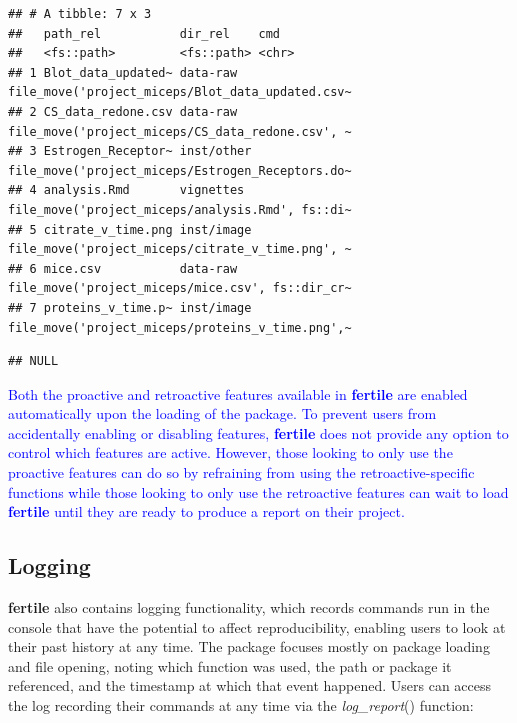 \documentclass[APA,LATO1COL]{WileyNJD-v2}\usepackage[]{graphicx}\usepackage[]{color}
\makeatletter
\newenvironment{kframe}{%
 \def\at@end@of@kframe{}%
 \ifinner\ifhmode%
  \def\at@end@of@kframe{\end{minipage}}%
  \begin{minipage}{\columnwidth}%
 \fi\fi%
 \def\FrameCommand##1{\hskip\@totalleftmargin \hskip-\fboxsep
 \colorbox{shadecolor}{##1}\hskip-\fboxsep
     \hskip-\linewidth \hskip-\@totalleftmargin \hskip\columnwidth}%
 \MakeFramed {\advance\hsize-\width
   \@totalleftmargin\z@ \linewidth\hsize
   \@setminipage}}%
 {\par\unskip\endMakeFramed%
 \at@end@of@kframe}
\newenvironment{knitrout}{}{} %
\newcommand{\pkg}[1]{\textbf{#1}}
\newcommand{\func}[1]{\textit{#1}()}
\makeatother
\begin{document}
\begin{knitrout}
\begin{kframe}
{\ttfamily\noindent\itshape\color{messagecolor}{\#\# --\ \  Suggestions for moving files ------------------------------- fertile 0.0.0.9027 --}}\begin{verbatim}
## # A tibble: 7 x 3
##   path_rel           dir_rel    cmd                                             
##   <fs::path>         <fs::path> <chr>                                           
## 1 Blot_data_updated~ data-raw   file_move('project_miceps/Blot_data_updated.csv~
## 2 CS_data_redone.csv data-raw   file_move('project_miceps/CS_data_redone.csv', ~
## 3 Estrogen_Receptor~ inst/other file_move('project_miceps/Estrogen_Receptors.do~
## 4 analysis.Rmd       vignettes  file_move('project_miceps/analysis.Rmd', fs::di~
## 5 citrate_v_time.png inst/image file_move('project_miceps/citrate_v_time.png', ~
## 6 mice.csv           data-raw   file_move('project_miceps/mice.csv', fs::dir_cr~
## 7 proteins_v_time.p~ inst/image file_move('project_miceps/proteins_v_time.png',~
\end{verbatim}


{\ttfamily\noindent\itshape\color{messagecolor}{\#\# --\ \  Problematic paths logged ----------------------------------- fertile 0.0.0.9027 --}}\begin{verbatim}
## NULL
\end{verbatim}
\end{kframe}
\end{knitrout}

\textcolor{blue}{Both the proactive and retroactive features available in \pkg{fertile} are enabled automatically upon the loading of the package. To prevent users from accidentally enabling or disabling features, \pkg{fertile} does not provide any option to control which features are active. However, those looking to only use the proactive features can do so by refraining from using the retroactive-specific functions while those looking to only use the retroactive features can wait to load \pkg{fertile} until they are ready to produce a report on their project.}

\subsection{Logging}

\pkg{fertile} also contains logging functionality, which records commands run in the console that have the potential to affect reproducibility, enabling users to look at their past history at any time. The package focuses mostly on package loading and file opening, noting which function was used, the path or package it referenced, and the timestamp at which that event happened. Users can access the log recording their commands at any time via the \func{log\_report} function:
\end{document}
